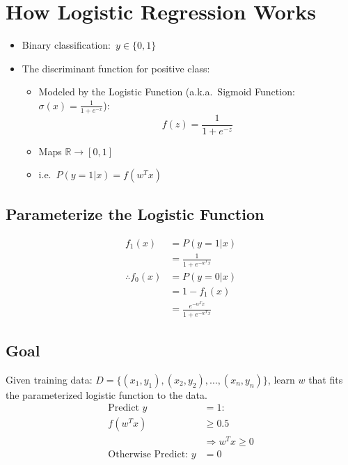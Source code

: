 \documentclass[12pt]{article}
\begin{document}
    \section{How Logistic Regression Works}
        \begin{itemize}
            \item Binary classification:\ $y \in \{0, 1\}$
            \item The discriminant function for positive class:
            \begin{itemize}
                \item Modeled by the Logistic Function (a.k.a.\ Sigmoid Function: $\sigma(x) = \frac{1}{1 + e^{-x}}$):
                \begin{equation}
                    f(z) = \frac{1}{1 + e^{-z}}
                \end{equation}
                \item Maps $\mathbb{R} \rightarrow [0, 1]$
                \item i.e.\ $P(y = 1 | x) = f({w^T}x)$
            \end{itemize}
        \end{itemize}
        \subsection{Parameterize the Logistic Function}
            \begin{align*}
                f_1(x) &= P(y = 1 | x) \\
                &= \frac{1}{1 + e^{-{w^T}x}} \\
                \therefore f_0(x) &= P(y = 0 | x) \\
                &= 1 - f_1(x) \\
                &= \frac{e^{-{w^T}x}}{1 + e^{-{w^T}x}}
            \end{align*}
        \subsection{Goal}
            Given training data: $D = \{(x_1, y_1), (x_2, y_2), \dots, (x_n, y_n)\}$, 
            learn $w$ that fits the parameterized logistic function to the data.
            \begin{align*}
                \text{Predict } y &= 1: \\
                f({w^T}x) &\geq 0.5 \\
                &\Rightarrow {w^T}x \geq 0 \\
                \text{Otherwise Predict: } y &= 0
            \end{align*}
\end{document}
